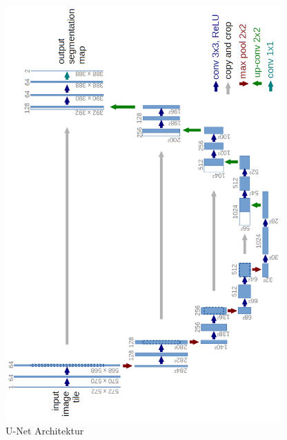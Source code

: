 
\begin{figure}[htb]
	\begin{center}
		\includegraphics[width=300pt, angle=270]{bilder/u-net-architecture}
		\caption{U-Net Architektur}\label{Fig:unet-diagram}
	\end{center}
\end{figure}

